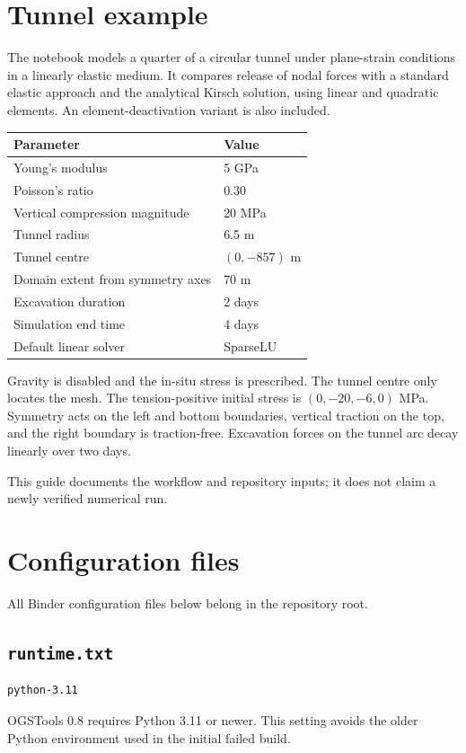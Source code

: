 \documentclass[11pt,a4paper]{tubaf-report}
\begin{document}
\section{Tunnel example}
The notebook models a quarter of a circular tunnel under plane-strain conditions in a linearly elastic medium. It compares release of nodal forces with a standard elastic approach and the analytical Kirsch solution, using linear and quadratic elements. An element-deactivation variant is also included.
\begin{center}
\begin{tabularx}{\textwidth}{@{}Xl@{}}
\toprule Parameter & Value \\
\midrule
Young's modulus & 5 GPa \\
Poisson's ratio & 0.30 \\
Vertical compression magnitude & 20 MPa \\
Tunnel radius & 6.5 m \\
Tunnel centre & $(0,-857)$ m \\
Domain extent from symmetry axes & 70 m \\
Excavation duration & 2 days \\
Simulation end time & 4 days \\
Default linear solver & SparseLU \\
\bottomrule
\end{tabularx}
\end{center}
Gravity is disabled and the in-situ stress is prescribed. The tunnel centre only locates the mesh. The tension-positive initial stress is $(0,-20,-6,0)$ MPa. Symmetry acts on the left and bottom boundaries, vertical traction on the top, and the right boundary is traction-free. Excavation forces on the tunnel arc decay linearly over two days.

This guide documents the workflow and repository inputs; it does not claim a newly verified numerical run.
\section{Configuration files}
All Binder configuration files below belong in the repository root.
\subsection*{\texttt{runtime.txt}}
\begin{lstlisting}
python-3.11
\end{lstlisting}
OGSTools 0.8 requires Python 3.11 or newer. This setting avoids the older Python environment used in the initial failed build.
\end{document}

